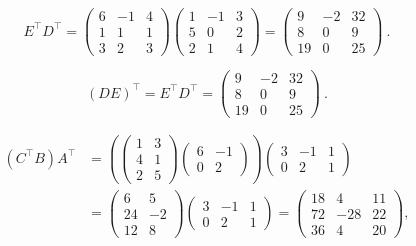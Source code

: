 {
\[
E^\top D^\top =
\begin{pmatrix} 6 & -1 & 4 \\ 1 & 1 & 1 \\ 3 & 2 & 3 \end{pmatrix}
\begin{pmatrix} 1 & -1 & 3 \\ 5 & 0 & 2 \\ 2 & 1 & 4 \end{pmatrix}
= \begin{pmatrix} 9 & -2 & 32 \\ 8 & 0 & 9 \\ 19 & 0 & 25 \end{pmatrix} \ .
\]

\[
(DE)^\top = E^\top D^\top =
\begin{pmatrix} 9 & -2 & 32 \\ 8 & 0 & 9 \\ 19 & 0 & 25 \end{pmatrix} \ .
\]

\begin{align*}
(C^\top B)A^\top
&= \left(
\begin{pmatrix} 1 & 3 \\ 4 & 1 \\ 2 & 5 \end{pmatrix}
\begin{pmatrix} 6 & -1 \\ 0 & 2 \end{pmatrix}\right)
\begin{pmatrix} 3 & -1 & 1 \\ 0 & 2 & 1 \end{pmatrix} \\
&= \begin{pmatrix} 6 & 5 \\ 24 & -2 \\ 12 & 8 \end{pmatrix}
\begin{pmatrix} 3 & -1 & 1 \\ 0 & 2 & 1 \end{pmatrix}
= \begin{pmatrix} 18 & 4 & 11 \\ 72 & -28 & 22 \\ 36 & 4 & 20 \end{pmatrix} ,
\end{align*}
}


